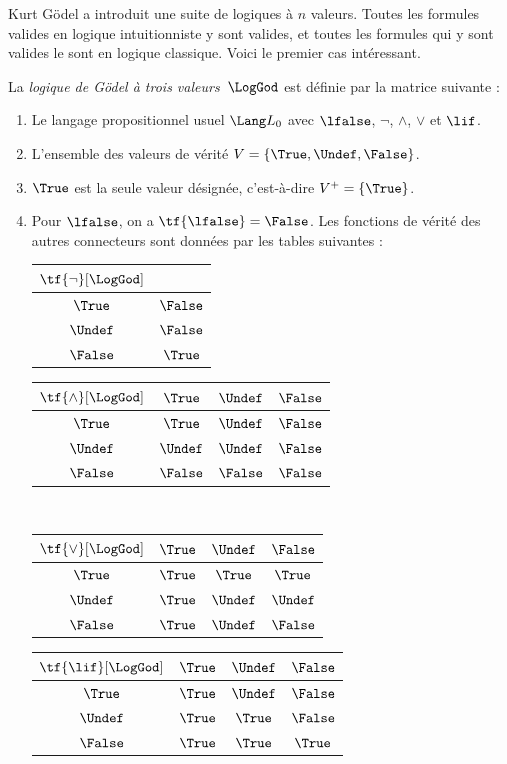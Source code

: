 \documentclass[../../../include/open-logic-section]{subfiles}
\begin{document}


Kurt G\"odel a introduit une suite
de logiques à $n$ valeurs. Toutes les
formules valides en logique
intuitionniste y sont valides, et
toutes les formules qui y sont valides
le sont en logique classique. Voici
le premier cas intéressant.

\begin{defn}
La \emph{logique de G\"odel à trois
valeurs}~$\LogGod$ est définie par
la matrice suivante :
\begin{enumerate}
  \item Le langage propositionnel usuel
  $\Lang L_0$ avec $\lfalse$,
  $\lnot$, $\land$, $\lor$ et $\lif$.
  \item L'ensemble des valeurs de vérité
  $V=\{\True,\Undef,\False\}$.
  \item $\True$ est la seule valeur
  désignée, c'est-à-dire
  $V^+=\{\True\}$.
  \item Pour $\lfalse$, on a
  $\tf{\lfalse}=\False$. Les fonctions
  de vérité des autres connecteurs
  sont données par les tables suivantes :
  \begin{center}
    \begin{tabular}{c|c}
      $\tf{\lnot}[\LogGod]$ & \\
      \hline
      $\True$ & $\False$ \\
      $\Undef$ & $\False$ \\
      $\False$ & $\True$
    \end{tabular}
    \quad
    \begin{tabular}{c|ccc}
      $\tf{\land}[\LogGod]$ & $\True$ & $\Undef$ & $\False$ \\
      \hline
      $\True$ & $\True$ & $\Undef$ & $\False$ \\
      $\Undef$ & $\Undef$ & $\Undef$ & $\False$ \\
      $\False$ & $\False$ & $\False$ & $\False$
    \end{tabular}
    \\[2ex]
    \begin{tabular}{c|ccc}
      $\tf{\lor}[\LogGod]$ & $\True$ & $\Undef$ & $\False$ \\
      \hline
      $\True$ & $\True$ & $\True$ & $\True$ \\
      $\Undef$ & $\True$ & $\Undef$ & $\Undef$ \\
      $\False$ & $\True$ & $\Undef$ & $\False$
    \end{tabular}
    \quad
    \begin{tabular}{c|ccc}
      $\tf{\lif}[\LogGod]$ & $\True$ & $\Undef$ & $\False$ \\
      \hline
      $\True$ & $\True$ & $\Undef$ & $\False$ \\
      $\Undef$ & $\True$ & $\True$ & $\False$ \\
      $\False$ & $\True$ & $\True$ & $\True$
    \end{tabular}
  \end{center}
\end{enumerate}
\end{defn}
\end{document}
